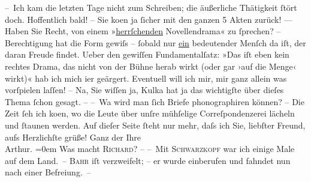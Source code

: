 \begin{ledgroupsized}[t]{13cm}
           \pstart
           – Ich kam die letzten Tage nicht zum Schreiben; die äußerliche Thätigkeit ſtört
                    doch. Hoffentlich bald! – Sie {\pb}ko{\geminationm}en ja ſicher mit den ganzen 5 Akten zurück!
                    ––\pend
           \pstart
           Haben Sie Recht, von einem »\uline{herrſchenden}
                    Novellendrama« zu ſprechen? – Berechtigung hat die Form gewiſs – ſobald nur \uline{ein} bedeutender Menſch da iſt, der daran Freude
                    findet. Ueber den gewiſſen Fundamentalſatz: »Das iſt eben kein rechtes Drama,
                    das nicht von der Bühne herab wirkt (oder gar ›auf die Menge‹ wirkt)« hab ich {\pb}mich
                        i{\geminationm}er geärgert. Eventuell will ich mir, mir ganz
                    allein was vorſpielen laſſen! – Na, Sie wiſſen ja, Kulka hat ja das wichtigſte über dieſes Thema ſchon gesagt.
                    –\pend
           \pstart
           – Wa{\geminationn} wird man ſich Briefe phonographiren können? –
                    Die Zeit ſeh ich ko{\geminationm}en, wo die Leute über unſre
                    mühſelige Correſpondenzerei lächeln und ſtaunen werden.\pend
           \pstart
           {\pb}Auf dieſer Seite ſteht nur mehr, daſs ich Sie,
                    liebſter Freund, aufs Herzlichſte grüße!\pend
           \pstart
           Ganz der Ihre{\\[\baselineskip]}\spacefill\mbox{Arthur.}\pend
           \leftskip=0em{}\pstart
           \noindent{}Was macht \textsc{Richard}? –\pend
           \pstart
           – Mit \textsc{Schwarzkopf} war ich einige Male auf dem Land. –\pend
           \pstart
           \textsc{Bahr} iſt verzweifelt; – er wurde einberufen und fahndet nun nach
                        einer Befreiung. –\pend
           
         
         \endnumbering{}\end{ledgroupsized}  \newcommand{\dateiname}{L00112}\newcommand{\titel}{Arthur Schnitzler an Hugo von Hofmannsthal, [6. 8. 1892]}\newcommand{\editorInnen}{ Martin Anton Müller und Gerd-Hermann Susen}
      